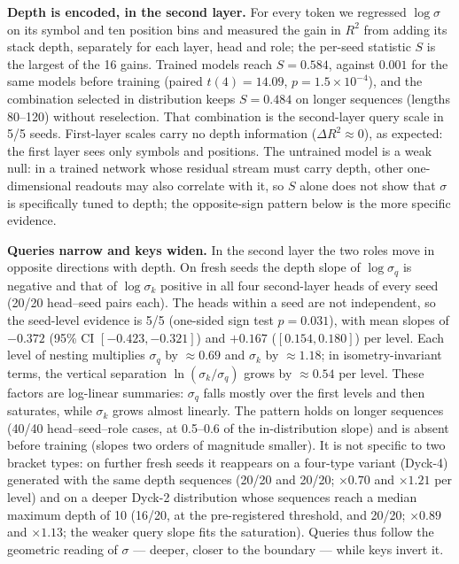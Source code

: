 \documentclass[11pt]{article}
\begin{document}
\textbf{Depth is encoded, in the second layer.} For every token we regressed $\log\sigma$ on its symbol and ten position bins and measured the gain in $R^2$ from adding its stack depth, separately for each layer, head and role; the per-seed statistic $S$ is the largest of the 16 gains. Trained models reach $S = 0.584$, against $0.001$ for the same models before training (paired $t(4) = 14.09$, $p = 1.5\times10^{-4}$), and the combination selected in distribution keeps $S = 0.484$ on longer sequences (lengths 80--120) without reselection. That combination is the second-layer query scale in 5/5 seeds. First-layer scales carry no depth information ($\Delta R^2 \approx 0$), as expected: the first layer sees only symbols and positions. The untrained model is a weak null: in a trained network whose residual stream must carry depth, other one-dimensional readouts may also correlate with it, so $S$ alone does not show that $\sigma$ is specifically tuned to depth; the opposite-sign pattern below is the more specific evidence.

\textbf{Queries narrow and keys widen.} In the second layer the two roles move in opposite directions with depth. On fresh seeds the depth slope of $\log\sigma_q$ is negative and that of $\log\sigma_k$ positive in all four second-layer heads of every seed (20/20 head--seed pairs each). The heads within a seed are not independent, so the seed-level evidence is 5/5 (one-sided sign test $p = 0.031$), with mean slopes of $-0.372$ (95\% CI $[-0.423, -0.321]$) and $+0.167$ ($[0.154, 0.180]$) per level. Each level of nesting multiplies $\sigma_q$ by $\approx 0.69$ and $\sigma_k$ by $\approx 1.18$; in isometry-invariant terms, the vertical separation $\ln(\sigma_k/\sigma_q)$ grows by $\approx 0.54$ per level. These factors are log-linear summaries: $\sigma_q$ falls mostly over the first levels and then saturates, while $\sigma_k$ grows almost linearly. The pattern holds on longer sequences (40/40 head--seed--role cases, at 0.5--0.6 of the in-distribution slope) and is absent before training (slopes two orders of magnitude smaller). It is not specific to two bracket types: on further fresh seeds it reappears on a four-type variant (Dyck-4) generated with the same depth sequences (20/20 and 20/20; $\times 0.70$ and $\times 1.21$ per level) and on a deeper Dyck-2 distribution whose sequences reach a median maximum depth of 10 (16/20, at the pre-registered threshold, and 20/20; $\times 0.89$ and $\times 1.13$; the weaker query slope fits the saturation). Queries thus follow the geometric reading of $\sigma$ --- deeper, closer to the boundary --- while keys invert it.
\end{document}
